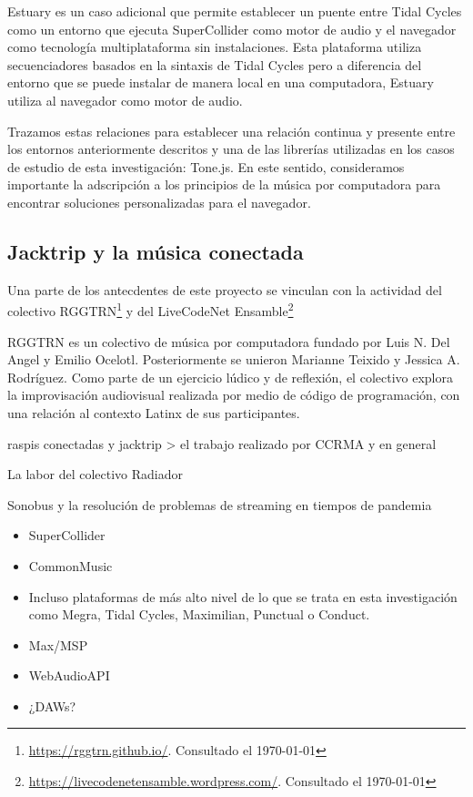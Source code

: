 Estuary es un caso adicional que permite establecer un puente entre Tidal Cycles como un entorno que ejecuta SuperCollider como motor de audio y el navegador como tecnología multiplataforma sin instalaciones. Esta plataforma utiliza secuenciadores basados en la sintaxis de Tidal Cycles pero a diferencia del entorno que se puede instalar de manera local en una computadora, Estuary utiliza al navegador como motor de audio. 

Trazamos estas relaciones para establecer una relación continua y presente entre los entornos anteriormente descritos y una de las librerías utilizadas en los casos de estudio de esta investigación: Tone.js. En este sentido, consideramos importante la adscripción a los principios de la música por computadora para encontrar soluciones personalizadas para el navegador.


\subsection{Jacktrip y la música conectada}

Una parte de los antecdentes de este proyecto se vinculan con la actividad del colectivo RGGTRN\footnote{\url{https://rggtrn.github.io/}. Consultado el \today} y del LiveCodeNet Ensamble\footnote{\url{https://livecodenetensamble.wordpress.com/}. Consultado el \today}

RGGTRN es un colectivo de música por computadora fundado por Luis N. Del Angel y Emilio Ocelotl. Posteriormente se unieron Marianne Teixido y Jessica A. Rodríguez. Como parte de un ejercicio lúdico y de reflexión, el colectivo explora la improvisación audiovisual realizada por medio de código de programación, con una relación al contexto Latinx de sus participantes.


raspis conectadas y jacktrip > el trabajo realizado por CCRMA y en general 

La labor del colectivo Radiador


Sonobus y la resolución de problemas de streaming en tiempos de pandemia

\begin{itemize}
\item SuperCollider
\item CommonMusic 
\item Incluso plataformas de más alto nivel de lo que se trata en esta investigación como Megra, Tidal Cycles, Maximilian, Punctual o Conduct.
\item Max/MSP
\item WebAudioAPI
\item ¿DAWs? 
\end{itemize}

